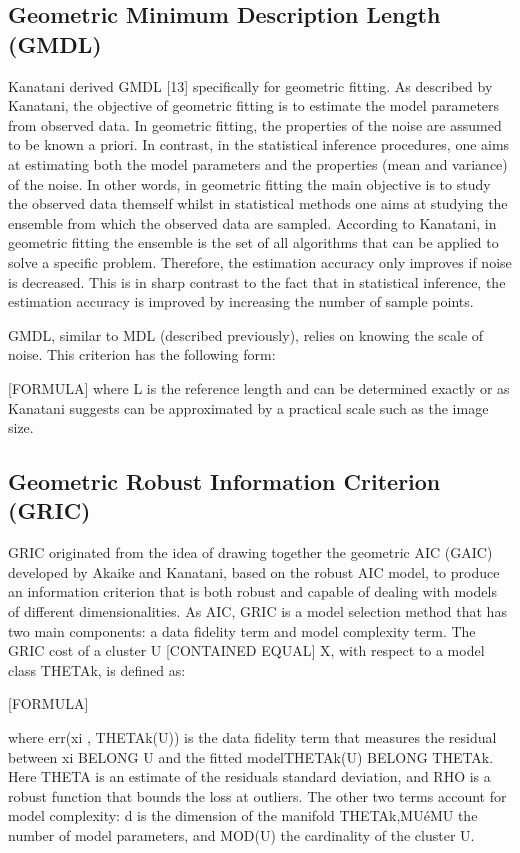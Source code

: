 \documentclass[12pt]{article}
\begin{document}
\subsection{Geometric Minimum Description Length (GMDL)
}
Kanatani derived GMDL [13] specifically for geometric fitting.
As described by Kanatani, the objective of geometric fitting is to estimate the model parameters from observed data. In geometric fitting, the properties of the noise are assumed to be known a priori. In contrast, in the statistical inference procedures, one aims at estimating both the model parameters and the properties (mean and variance) of the noise. In other words, in geometric fitting the main objective is to study the observed data themself whilst in statistical methods one aims at studying the ensemble from which the observed data are sampled. According to Kanatani, in geometric fitting the ensemble is the set of all algorithms that can be applied to solve a specific problem. Therefore, the estimation accuracy only improves if noise is decreased. This is in sharp contrast to the fact that in statistical inference, the estimation accuracy is improved by increasing the number of sample points.

GMDL, similar to MDL (described previously), relies on knowing the scale of noise. This criterion has the following form: 


[FORMULA]
where L is the reference length and can be determined exactly or as Kanatani suggests can be approximated by a practical scale such as the image size.

\subsection{ Geometric Robust Information Criterion (GRIC)
}
GRIC originated from the idea of drawing together the geometric AIC (GAIC) developed by Akaike and Kanatani, based on the robust AIC model, to produce an information criterion that is both robust and capable of dealing with models of different dimensionalities.
As AIC, GRIC is a model selection method that has two main components: a data fidelity term and model complexity term.
The GRIC cost of a cluster U [CONTAINED EQUAL] X, with respect to a model class THETAk, is defined as: 

[FORMULA]

where err(xi , THETAk(U)) is the data fidelity term that measures the residual between xi BELONG U and the fitted modelTHETAk(U) BELONG THETAk. Here THETA is an estimate of the residuals standard deviation, and RHO is a robust function that bounds the loss at outliers. The other two terms account for model complexity: d is the dimension of the manifold THETAk,MUéMU the number of model parameters, and MOD(U) the cardinality of the cluster U.
\end{document}
